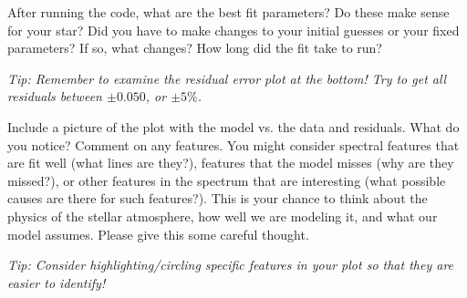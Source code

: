\documentclass[12pt]{article}
\newenvironment{question}[1]
  {\par\noindent\textbf{#1}\par\vspace{0.5em}}
  {\vspace{1em}}
\newenvironment{answer}
  {\par\noindent\par\vspace{0.5em}\noindent\ignorespaces}
  {\vspace{1em}}
\begin{document}
\begin{answer}
\end{answer}

\vspace{10em}

\begin{question}{}
    After running the code, what are the best fit parameters? Do these make sense for your star? Did you have to make changes to your initial guesses or your fixed parameters? If so, what changes? How long did the fit take to run?

    \textit{Tip: Remember to examine the residual error plot at the bottom! Try to get all residuals between $\pm 0.050$, or $\pm 5\%$.}
\end{question}

\begin{answer}
\end{answer}

\vspace{10em}

\begin{question}{}
    Include a picture of the plot with the model vs. the data and residuals. What do you notice? Comment on any features. You might consider spectral features that are fit well (what lines are they?), features that the model misses (why are they missed?), or other features in the spectrum that are interesting (what possible causes are there for such features?). This is your chance to think about the physics of the stellar atmosphere, how well we are modeling it, and what our model assumes. Please give this some careful thought.

    \textit{Tip: Consider highlighting/circling specific features in your plot so that they are easier to identify!}
\end{question}


\begin{answer}
\end{answer}

\vspace{10em}
\end{document}
